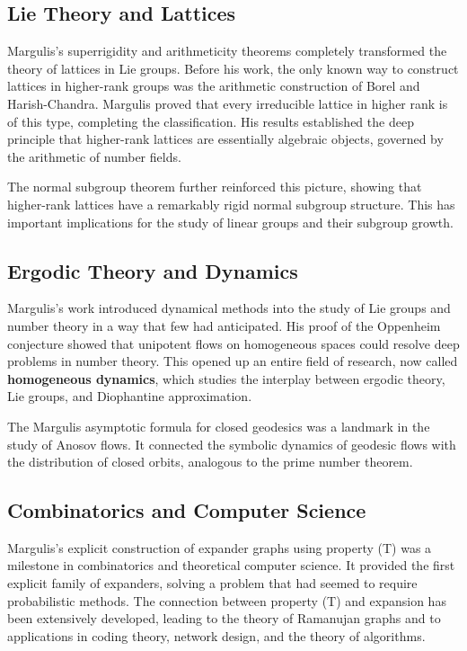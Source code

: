 \subsection{Lie Theory and Lattices}

Margulis's superrigidity and arithmeticity theorems completely transformed the theory of lattices in Lie groups. Before his work, the only known way to construct lattices in higher-rank groups was the arithmetic construction of Borel and Harish-Chandra. Margulis proved that every irreducible lattice in higher rank is of this type, completing the classification. His results established the deep principle that higher-rank lattices are essentially algebraic objects, governed by the arithmetic of number fields.

The normal subgroup theorem further reinforced this picture, showing that higher-rank lattices have a remarkably rigid normal subgroup structure. This has important implications for the study of linear groups and their subgroup growth.

\subsection{Ergodic Theory and Dynamics}

Margulis's work introduced dynamical methods into the study of Lie groups and number theory in a way that few had anticipated. His proof of the Oppenheim conjecture showed that unipotent flows on homogeneous spaces could resolve deep problems in number theory. This opened up an entire field of research, now called \textbf{homogeneous dynamics}, which studies the interplay between ergodic theory, Lie groups, and Diophantine approximation.

The Margulis asymptotic formula for closed geodesics was a landmark in the study of Anosov flows. It connected the symbolic dynamics of geodesic flows with the distribution of closed orbits, analogous to the prime number theorem.

\subsection{Combinatorics and Computer Science}

Margulis's explicit construction of expander graphs using property (T) was a milestone in combinatorics and theoretical computer science. It provided the first explicit family of expanders, solving a problem that had seemed to require probabilistic methods. The connection between property (T) and expansion has been extensively developed, leading to the theory of Ramanujan graphs and to applications in coding theory, network design, and the theory of algorithms.

